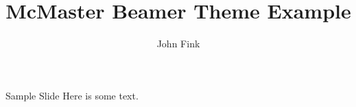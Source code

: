 \documentclass{beamer}
\title{McMaster Beamer Theme Example}
\author{John Fink}
\date{}
\begin{document}
	\begin{frame}[plain]
		\maketitle
	\end{frame}
	\begin{frame}{Sample Slide}
		Here is some text.
	\end{frame}
\end{document}

